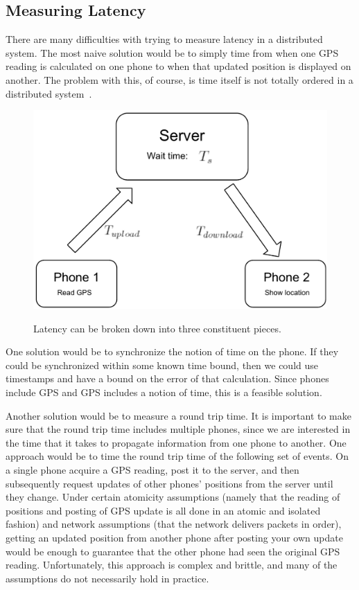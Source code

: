 \documentclass{acm_proc_article-sp}
\begin{document}
\subsection{Measuring Latency}\label{measuring}

There are many difficulties with trying to measure latency in a
distributed system.  The most naive solution would be to simply time
from when one GPS reading is calculated on one phone to when that
updated position is displayed on another. The problem with this, of
course, is time itself is not totally ordered in a distributed
system~\cite{Lamport:1978:TCO}.

\begin{figure}
\centering
\includegraphics[scale=0.4]{figs/LatencyExplanation}
\label{fig:LatencyExplanation}
\caption{Latency can be broken down into three constituent pieces.}
\end{figure}

One solution would be to synchronize the notion of time on the phone.
If they could be synchronized within some known time bound, then we
could use timestamps and have a bound on the error of that
calculation.  Since phones include GPS and GPS includes a notion of
time, this is a feasible solution.

Another solution would be to measure a round trip time.  It is
important to make sure that the round trip time includes multiple
phones, since we are interested in the time that it takes to propagate
information from one phone to another.  One approach would be to time
the round trip time of the following set of events.  On a single phone
acquire a GPS reading, post it to the server, and then subsequently
request updates of other phones' positions from the server until they
change.  Under certain atomicity assumptions (namely that the reading
of positions and posting of GPS update is all done in an atomic and
isolated fashion) and network assumptions (that the network delivers
packets in order), getting an updated position from another phone
after posting your own update would be enough to guarantee that the
other phone had seen the original GPS reading.  Unfortunately, this
approach is complex and brittle, and many of the assumptions do not
necessarily hold in practice.
\end{document}
